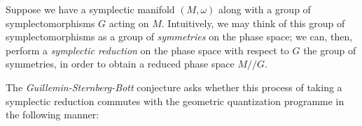 Suppose we have a symplectic manifold $(M,\omega)$ along with a group of symplectomorphisms $G$ acting on $M$. Intuitively, we may think of this group of symplectomorphisms as a group of \emph{symmetries} on the phase space; we can, then, perform a \emph{symplectic reduction} on the phase space with respect to $G$ the group of symmetries, in order to obtain a reduced phase space $M // G$.

The \emph{Guillemin-Sternberg-Bott} conjecture asks whether this process of taking a symplectic reduction commutes with the geometric quantization programme in the following manner:


